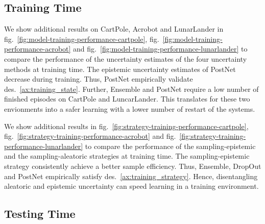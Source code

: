 \subsection{Training Time}

We show additional results on CartPole, Acrobot and LunarLander in fig.~\ref{fig:model-training-performance-cartpole}, fig.~\ref{fig:model-training-performance-acrobot} and fig.~\ref{fig:model-training-performance-lunarlander} to compare the performance of the uncertainty estimates of the four uncertainty methods at training time. The epistemic uncertainty estimates of PostNet decrease during training. Thus, PostNet empirically validate des.~\ref{ax:training_state}. Further, Ensemble and PostNet require a low number of finished episodes on CartPole and LuncarLander. This translates for these two envionments into a safer learning with a lower number of restart of the systems.





We show additional results in fig.~\ref{fig:strategy-training-performance-cartpole}, fig.~\ref{fig:strategy-training-performance-acrobot} and fig.~\ref{fig:strategy-training-performance-lunarlander} to compare the performance of the sampling-epistemic and the sampling-aleatoric strategies at training time. The sampling-epistemic strategy consistently achieve a better sample efficiency. Thus, Ensemble, DropOut and PostNet empirically satisfy des.~\ref{ax:training_strategy}. Hence, disentangling aleatoric and epistemic uncertainty can speed learning in a training environment.





\subsection{Testing Time}


